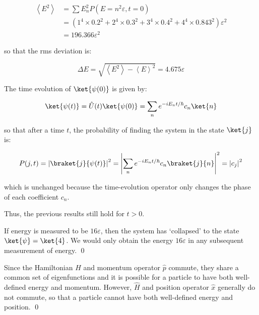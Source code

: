 \documentclass[12pt]{article}
\begin{document}
\begin{equation}
    \begin{split}
        \left\langle E^{2} \right\rangle &= \sum E_{n}^{2} P(E = n^{2}\varepsilon, t = 0) \\
        &= \left( 1^{4} \times 0.2^{2} + 2^{4} \times 0.3^{2} + 3^{4} \times 0.4^{2} + 4^{4} \times 0.843^{2} \right) \varepsilon^{2} \\
        &= 196.366 \varepsilon^{2}
    \end{split}
\end{equation}

so that the rms deviation is:

\begin{equation}
    \Delta E = \sqrt{\left\langle E^{2} \right\rangle - \left\langle E \right\rangle^{2}} = 4.675 \varepsilon
\end{equation}

The time evolution of $\ket{\psi(0)}$ is given by:

\begin{equation}
    \ket{\psi(t)} = \hat{U}(t) \ket{\psi(0)} = \sum_{n} e^{-iE_{n}t/\hbar} c_{n} \ket{n}
\end{equation}

so that after a time $t$, the probability of finding the system in the state $\ket{j}$ is:

\begin{equation}
    P(j, t) = \left| \braket{j}{\psi(t)} \right|^{2} = \left| \sum_{n} e^{-iE_{n}t/\hbar} c_{n} \braket{j}{n} \right|^{2} = \left| c_{j} \right|^{2}
\end{equation}

which is unchanged because the time-evolution operator only changes the phase of each coefficient $c_{n}$.

Thus, the previous results still hold for $t > 0$.

If energy is measured to be $16\varepsilon$, then the system has `collapsed' to the state $\ket{\psi} = \ket{4}$. We would only obtain the energy $16\varepsilon$ in any subsequent measurement of energy.
\qed


Since the Hamiltonian $\hat{H}$ and momentum operator $\hat{p}$ commute, they share a common set of eigenfunctions and it is possible for a particle to have both well-defined energy and momentum. However, $\hat{H}$ and position operator $\hat{x}$ generally do not commute, so that a particle cannot have both well-defined energy and position.
\qed
\end{document}
